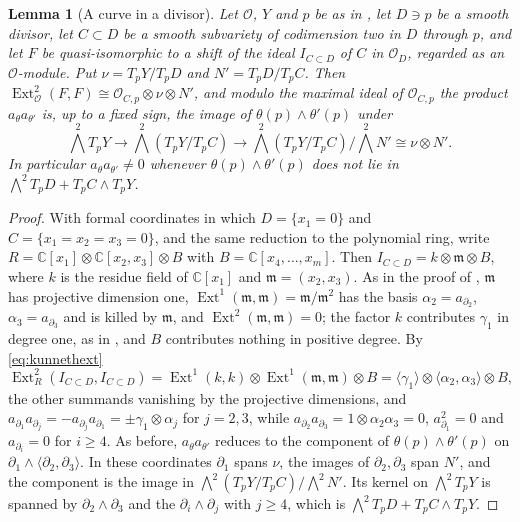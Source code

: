 \documentclass[11pt,reqno]{amsart}
\theoremstyle{plain}
\newtheorem{lemma}[theorem]{Lemma}
\theoremstyle{definition}
\theoremstyle{remark}
\newcommand{\CC}{\mathbb{C}}
\newcommand{\cO}{\mathcal{O}}
\DeclareMathOperator{\Ext}{Ext}
\begin{document}
\begin{lemma}[A curve in a divisor]\label{lem:divisorgerm}
Let $\cO$, $Y$ and $p$ be as in , let $D\ni p$ be a
smooth divisor, let $C\subset D$ be a smooth subvariety of codimension two in
$D$ through $p$, and let $F$ be quasi-isomorphic to a shift of the ideal
$I_{C\subset D}$ of $C$ in $\cO_{D}$, regarded as an $\cO$-module. Put
$\nu=T_{p}Y/T_{p}D$ and $N'=T_{p}D/T_{p}C$. Then
$\Ext^{2}_{\cO}(F,F)\cong\cO_{C,p}\otimes\nu\otimes N'$, and modulo the maximal
ideal of $\cO_{C,p}$ the product $a_{\theta}a_{\theta'}$ is, up to a fixed
sign, the image of $\theta(p)\wedge\theta'(p)$ under
\[
  \textstyle\bigwedge^{2}T_{p}Y\longrightarrow\bigwedge^{2}(T_{p}Y/T_{p}C)
  \longrightarrow\bigwedge^{2}(T_{p}Y/T_{p}C)\big/\bigwedge^{2}N'\cong\nu\otimes N'.
\]
In particular $a_{\theta}a_{\theta'}\ne0$ whenever $\theta(p)\wedge\theta'(p)$
does not lie in $\bigwedge^{2}T_{p}D+T_{p}C\wedge T_{p}Y$.
\end{lemma}

\begin{proof}
With formal coordinates in which $D=\{x_{1}=0\}$ and $C=\{x_{1}=x_{2}=x_{3}=0\}$,
and the same reduction to the polynomial ring, write
$R=\CC[x_{1}]\otimes\CC[x_{2},x_{3}]\otimes B$ with $B=\CC[x_{4},\dots,x_{m}]$.
Then $I_{C\subset D}=k\otimes\mathfrak m\otimes B$, where $k$ is the residue
field of $\CC[x_{1}]$ and $\mathfrak m=(x_{2},x_{3})$. As in the proof of
, $\mathfrak m$ has projective dimension one,
$\Ext^{1}(\mathfrak m,\mathfrak m)=\mathfrak m/\mathfrak m^{2}$ has the basis
$\alpha_{2}=a_{\partial_{2}}$, $\alpha_{3}=a_{\partial_{3}}$ and is killed by
$\mathfrak m$, and $\Ext^{2}(\mathfrak m,\mathfrak m)=0$; the factor $k$
contributes $\gamma_{1}$ in degree one, as in , and $B$
contributes nothing in positive degree. By \eqref{eq:kunnethext}
\[
  \Ext^{2}_{R}(I_{C\subset D},I_{C\subset D})
  =\Ext^{1}(k,k)\otimes\Ext^{1}(\mathfrak m,\mathfrak m)\otimes B
  =\langle\gamma_{1}\rangle\otimes\langle\alpha_{2},\alpha_{3}\rangle\otimes B,
\]
the other summands vanishing by the projective dimensions, and
$a_{\partial_{1}}a_{\partial_{j}}=-a_{\partial_{j}}a_{\partial_{1}}=\pm\gamma_{1}\otimes\alpha_{j}$
for $j=2,3$, while $a_{\partial_{2}}a_{\partial_{3}}=1\otimes\alpha_{2}\alpha_{3}=0$,
$a_{\partial_{1}}^{2}=0$ and $a_{\partial_{i}}=0$ for $i\ge4$. As before,
$a_{\theta}a_{\theta'}$ reduces to the component of $\theta(p)\wedge\theta'(p)$
on $\partial_{1}\wedge\langle\partial_{2},\partial_{3}\rangle$. In these
coordinates $\partial_{1}$ spans $\nu$, the images of $\partial_{2},\partial_{3}$
span $N'$, and the component is the image in
$\bigwedge^{2}(T_{p}Y/T_{p}C)/\bigwedge^{2}N'$. Its kernel on
$\bigwedge^{2}T_{p}Y$ is spanned by $\partial_{2}\wedge\partial_{3}$ and the
$\partial_{i}\wedge\partial_{j}$ with $j\ge4$, which is
$\bigwedge^{2}T_{p}D+T_{p}C\wedge T_{p}Y$.
\end{proof}
\end{document}
